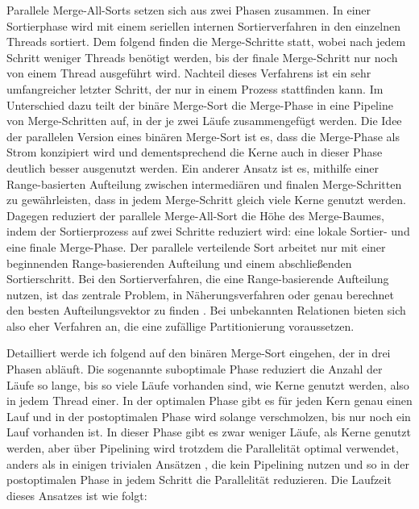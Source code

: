 \documentclass[a4paper,12pt,twoside]{article}
\begin{document}
Parallele Merge-All-Sorts \parencite[S. 831f]{Taniar2000} setzen sich aus zwei Phasen zusammen. In einer Sortierphase wird mit einem seriellen internen Sortierverfahren in den einzelnen Threads sortiert. Dem folgend finden die Merge-Schritte statt, wobei nach jedem Schritt weniger Threads benötigt werden, bis der finale Merge-Schritt nur noch von einem Thread ausgeführt wird. Nachteil dieses Verfahrens ist ein sehr umfangreicher letzter Schritt, der nur in einem Prozess stattfinden kann. Im Unterschied dazu teilt der binäre Merge-Sort \parencite[S. 832f]{Taniar2000} die Merge-Phase in eine Pipeline von Merge-Schritten auf, in der je zwei Läufe zusammengefügt werden. Die Idee der parallelen Version eines binären Merge-Sort \parencite[S. 833]{Taniar2000} ist es, dass die Merge-Phase als Strom konzipiert wird und dementsprechend die Kerne auch in dieser Phase deutlich besser ausgenutzt werden. Ein anderer Ansatz ist es, mithilfe einer Range-basierten Aufteilung zwischen intermediären und finalen Merge-Schritten zu gewährleisten, dass in jedem Merge-Schritt gleich viele Kerne genutzt werden. Dagegen reduziert der parallele Merge-All-Sort \parencite[S. 833f]{Taniar2000} die Höhe des Merge-Baumes, indem der Sortierprozess auf zwei Schritte reduziert wird: eine lokale Sortier- und eine finale Merge-Phase. Der parallele verteilende Sort arbeitet nur mit einer beginnenden Range-basierenden Aufteilung und einem abschließenden Sortierschritt. Bei den Sortierverfahren, die eine Range-basierende Aufteilung nutzen, ist das zentrale Problem, in Näherungsverfahren oder genau berechnet den besten Aufteilungsvektor zu finden \parencite{Lu1994, Iyer1989}. Bei unbekannten Relationen bieten sich also eher Verfahren an, die eine zufällige Partitionierung voraussetzen.

Detailliert werde ich \textcite[S. 333ff]{Bitton1983} folgend auf den binären Merge-Sort eingehen, der in drei Phasen abläuft. Die sogenannte suboptimale Phase reduziert die Anzahl der Läufe so lange, bis so viele Läufe vorhanden sind, wie Kerne genutzt werden, also in jedem Thread einer. In der optimalen Phase gibt es für jeden Kern genau einen Lauf und in der postoptimalen Phase wird solange verschmolzen, bis nur noch ein Lauf vorhanden ist. In dieser Phase gibt es zwar weniger Läufe, als Kerne genutzt werden, aber über Pipelining wird trotzdem die Parallelität optimal verwendet, anders als in einigen trivialen Ansätzen {\autocite{Yu1998}}, die kein Pipelining nutzen und so in der postoptimalen Phase in jedem Schritt die Parallelität reduzieren. Die Laufzeit dieses Ansatzes ist wie folgt:
\end{document}
